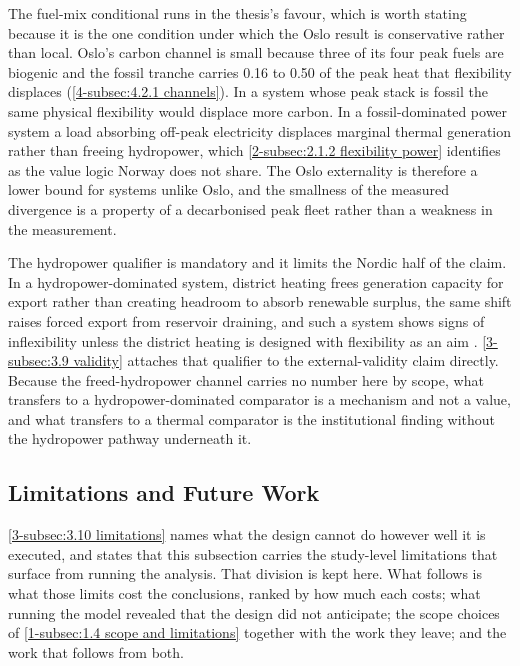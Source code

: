 The fuel-mix conditional runs in the thesis's favour, which is worth stating because it is the one condition under which the Oslo result is conservative rather than local. Oslo's carbon channel is small because three of its four peak fuels are biogenic and the fossil tranche carries 0.16 to 0.50 of the peak heat that flexibility displaces (\autoref{4-subsec:4.2.1 channels}). In a system whose peak stack is fossil the same physical flexibility would displace more carbon. In a fossil-dominated power system a load absorbing off-peak electricity displaces marginal thermal generation rather than freeing hydropower, which \autoref{2-subsec:2.1.2 flexibility power} identifies as the value logic Norway does not share. The Oslo externality is therefore a lower bound for systems unlike Oslo, and the smallness of the measured divergence is a property of a decarbonised peak fleet rather than a weakness in the measurement.

The hydropower qualifier is mandatory and it limits the Nordic half of the claim. In a hydropower-dominated system, district heating frees generation capacity for export rather than creating headroom to absorb renewable surplus, the same shift raises forced export from reservoir draining, and such a system shows signs of inflexibility unless the district heating is designed with flexibility as an aim \cite{askeland_balancing_2019}. \autoref{3-subsec:3.9 validity} attaches that qualifier to the external-validity claim directly. Because the freed-hydropower channel carries no number here by scope, what transfers to a hydropower-dominated comparator is a mechanism and not a value, and what transfers to a thermal comparator is the institutional finding without the hydropower pathway underneath it.

\subsection{Limitations and Future Work}
\label{5-subsec:5.5 future work}

\autoref{3-subsec:3.10 limitations} names what the design cannot do however well it is executed, and states that this subsection carries the study-level limitations that surface from running the analysis. That division is kept here. What follows is what those limits cost the conclusions, ranked by how much each costs; what running the model revealed that the design did not anticipate; the scope choices of \autoref{1-subsec:1.4 scope and limitations} together with the work they leave; and the work that follows from both.

